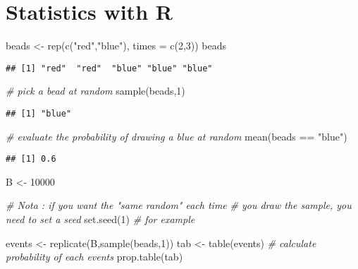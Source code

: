 \documentclass[
]{book}
\newenvironment{Shaded}{\begin{snugshade}}{\end{snugshade}}
\newcommand{\AttributeTok}[1]{\textcolor[rgb]{0.77,0.63,0.00}{#1}}
\newcommand{\CommentTok}[1]{\textcolor[rgb]{0.56,0.35,0.01}{\textit{#1}}}
\newcommand{\DecValTok}[1]{\textcolor[rgb]{0.00,0.00,0.81}{#1}}
\newcommand{\FunctionTok}[1]{\textcolor[rgb]{0.00,0.00,0.00}{#1}}
\newcommand{\NormalTok}[1]{#1}
\newcommand{\OtherTok}[1]{\textcolor[rgb]{0.56,0.35,0.01}{#1}}
\newcommand{\SpecialCharTok}[1]{\textcolor[rgb]{0.00,0.00,0.00}{#1}}
\newcommand{\StringTok}[1]{\textcolor[rgb]{0.31,0.60,0.02}{#1}}
\begin{document}
\hypertarget{statistics-with-r}{%
\chapter{Statistics with R}\label{statistics-with-r}}

\begin{Shaded}
\begin{Highlighting}[]
\NormalTok{beads }\OtherTok{\textless{}{-}} \FunctionTok{rep}\NormalTok{(}\FunctionTok{c}\NormalTok{(}\StringTok{"red"}\NormalTok{,}\StringTok{"blue"}\NormalTok{), }\AttributeTok{times =} \FunctionTok{c}\NormalTok{(}\DecValTok{2}\NormalTok{,}\DecValTok{3}\NormalTok{))}
\NormalTok{beads}
\end{Highlighting}
\end{Shaded}

\begin{verbatim}
## [1] "red"  "red"  "blue" "blue" "blue"
\end{verbatim}

\begin{Shaded}
\begin{Highlighting}[]
\CommentTok{\# pick a bead at random}
\FunctionTok{sample}\NormalTok{(beads,}\DecValTok{1}\NormalTok{)}
\end{Highlighting}
\end{Shaded}

\begin{verbatim}
## [1] "blue"
\end{verbatim}

\begin{Shaded}
\begin{Highlighting}[]
\CommentTok{\# evaluate the probability of drawing a blue at random}
\FunctionTok{mean}\NormalTok{(beads }\SpecialCharTok{==} \StringTok{"blue"}\NormalTok{)}
\end{Highlighting}
\end{Shaded}

\begin{verbatim}
## [1] 0.6
\end{verbatim}

\begin{Shaded}
\begin{Highlighting}[]
\NormalTok{B }\OtherTok{\textless{}{-}} \DecValTok{10000}

\CommentTok{\# Nota : if you want the "same random" each time }
\CommentTok{\# you draw the sample, you need to set a seed}
\FunctionTok{set.seed}\NormalTok{(}\DecValTok{1}\NormalTok{)}
\CommentTok{\# for example}



\NormalTok{events }\OtherTok{\textless{}{-}} \FunctionTok{replicate}\NormalTok{(B,}\FunctionTok{sample}\NormalTok{(beads,}\DecValTok{1}\NormalTok{))}
\NormalTok{tab }\OtherTok{\textless{}{-}} \FunctionTok{table}\NormalTok{(events)}
\CommentTok{\# calculate probability of each events}
\FunctionTok{prop.table}\NormalTok{(tab)}
\end{Highlighting}
\end{Shaded}
\end{document}
